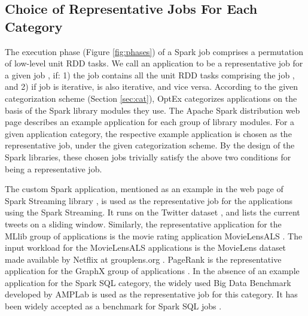 \documentclass[conference]{IEEEtran}
\begin{document}
 \subsection{Choice of Representative Jobs For Each Category} \label{sec:rep}
     The execution phase (Figure \ref{fig:phases}) of a Spark job comprises a permutation of low-level unit RDD tasks. We call an application  to be a representative job  for a given job , if:
1) the job  contains all the
 unit RDD tasks comprising the job ,
 and 2) if job  is iterative,  is also iterative, and vice versa. According to the given categorization scheme (Section \ref{sec:cat}), OptEx categorizes applications
     on the basis of the Spark library modules they use. The Apache Spark distribution web page \cite{apache:library1234} describes an
     example application for each group of library modules. For a given application category, the respective example application is chosen as the representative job, under the given categorization scheme. By the design of the Spark libraries, these chosen jobs trivially satisfy the above two conditions for being a representative job.
     \par The custom Spark application, mentioned as an example
     in the web page of Spark Streaming library \cite{apache:library1234}, is used as the representative job for the applications using the Spark Streaming.
     It runs on the Twitter dataset \cite{Zafarani+Liu:2009}
, and lists the current tweets on a sliding window. Similarly, the representative application for the MLlib group of applications is the movie rating application MovieLensALS \cite{apache:library1234}. The input workload for the MovieLensALS applications is the
MovieLens dataset made available by Netflix at grouplens.org \cite{MOVIELENS-DATA}. PageRank is the representative application for the GraphX group of applications \cite{apache:library1234}.
 In the absence of an example application for the Spark SQL category, the widely used Big Data Benchmark \cite{amplab:benchmark7890} developed by AMPLab is used as the representative job for this category. It has been widely accepted as a benchmark for Spark SQL jobs \cite{apache:library1234}. 





\newtheorem{definition}{Definition}
\newcommand{\argmax}{\arg\!\max}
\newcommand{\card}[1]{\ensuremath{\left\|#1\right\|}}
\def\tuple#1{\langle #1\rangle}
\newcommand{\bigslant}[2]{{\raisebox{.2em}{}\left/\raisebox{-.2em}{}\right.}}
\end{document}
